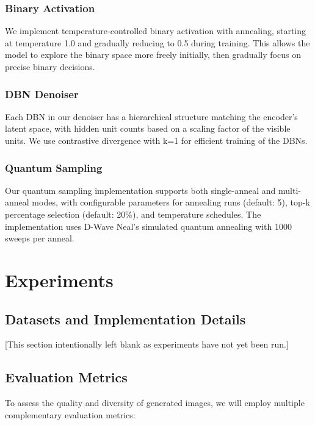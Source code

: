 \documentclass[10pt,twocolumn,letterpaper]{article}
\begin{document}
\subsubsection{Binary Activation}
We implement temperature-controlled binary activation with annealing, starting at temperature 1.0 and gradually reducing to 0.5 during training. This allows the model to explore the binary space more freely initially, then gradually focus on precise binary decisions.

\subsubsection{DBN Denoiser}
Each DBN in our denoiser has a hierarchical structure matching the encoder's latent space, with hidden unit counts based on a scaling factor of the visible units. We use contrastive divergence with k=1 for efficient training of the DBNs.

\subsubsection{Quantum Sampling}
Our quantum sampling implementation supports both single-anneal and multi-anneal modes, with configurable parameters for annealing runs (default: 5), top-k percentage selection (default: 20\%), and temperature schedules. The implementation uses D-Wave Neal's simulated quantum annealing with 1000 sweeps per anneal.

\section{Experiments}
\label{sec:experiments}

\subsection{Datasets and Implementation Details}
[This section intentionally left blank as experiments have not yet been run.]

\subsection{Evaluation Metrics}
To assess the quality and diversity of generated images, we will employ multiple complementary evaluation metrics:
\end{document}
